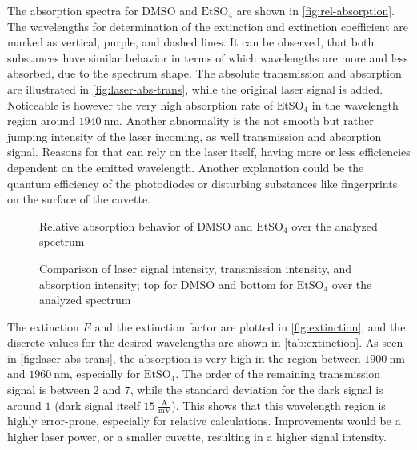 The absorption spectra for $\mathrm{DMSO}$ and $\mathrm{EtSO_4}$ are shown in \autoref{fig:rel-absorption}. The wavelengths for determination of the extinction and extinction coefficient are marked as vertical, purple, and dashed lines. It can be observed, that both substances have similar behavior in terms of which wavelengths are more and less absorbed, due to the spectrum shape. The absolute transmission and absorption are illustrated in \autoref{fig:laser-abs-trans}, while the original laser signal is added. Noticeable is however the very high absorption rate of $\mathrm{EtSO_4}$ in the wavelength region around $1940~\mathrm{nm}$. Another abnormality is the not smooth but rather jumping intensity of the laser incoming, as well transmission and absorption signal. Reasons for that can rely on the laser itself, having more or less efficiencies dependent on the emitted wavelength. Another explanation could be the quantum efficiency of the photodiodes or disturbing substances like fingerprints on the surface of the cuvette.

\begin{figure}[H]
    \centering
    
    \caption[Relative absorption spectra]{Relative absorption behavior of $\mathrm{DMSO}$ and $\mathrm{EtSO_4}$ over the analyzed spectrum}
    \label{fig:rel-absorption}
\end{figure}

\begin{figure}
    \centering
    \begin{turn}{90}
        
    \end{turn}
    \caption[Comparison of origin, transmitted and absorbed signals]{Comparison of laser signal intensity, transmission intensity, and absorption intensity; top for $\mathrm{DMSO}$ and bottom for $\mathrm{EtSO_4}$ over the analyzed spectrum}
    \label{fig:laser-abs-trans}
\end{figure}

The extinction $E$ and the extinction factor are plotted in \autoref{fig:extinction}, and the discrete values for the desired wavelengths are shown in \autoref{tab:extinction}. As seen in \autoref{fig:laser-abs-trans}, the absorption is very high in the region between $1900~\mathrm{nm}$ and $1960~\mathrm{nm}$, especially for $\mathrm{EtSO_4}$. The order of the remaining transmission signal is between $2$ and $7$, while the standard deviation for the dark signal is around $1$ (dark signal itself $15~\mathrm{\frac{A}{mV}}$). This shows that this wavelength region is highly error-prone, especially for relative calculations. Improvements would be a higher laser power, or a smaller cuvette, resulting in a higher signal intensity.


